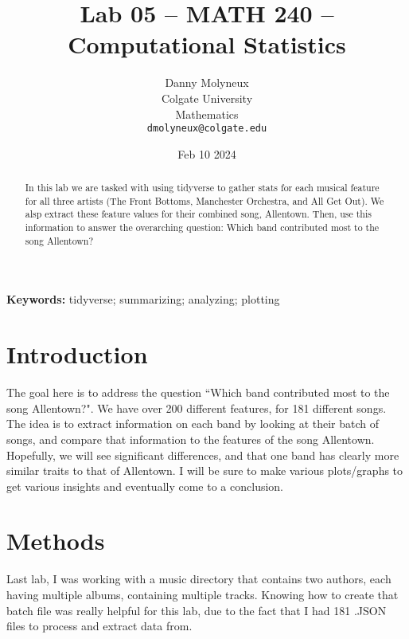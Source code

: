 \documentclass{article}\usepackage[]{graphicx}\usepackage[]{xcolor}
\begin{document}
\vspace{-1in}
\title{Lab 05 -- MATH 240 -- Computational Statistics}

\author{
  Danny Molyneux \\
  Colgate University  \\
  Mathematics  \\
  {\tt dmolyneux@colgate.edu}
}

\date{Feb 10 2024}

\maketitle


\begin{multicols}{2}
\begin{abstract}
In this lab we are tasked with using tidyverse \citep{tidyverse} to gather stats for each musical feature for all three artists (The Front Bottoms, Manchester Orchestra, and All Get Out). We alsp extract these feature values for their combined song, Allentown. Then, use this information to answer the overarching question: Which band contributed most to the song Allentown?
\end{abstract}

\noindent \textbf{Keywords:} tidyverse; summarizing; analyzing; plotting


\section{Introduction}
The goal here is to address the question ``Which band contributed most to the song Allentown?". We have over 200 different features, for 181 different songs. The idea is to extract information on each band by looking at their batch of songs, and compare that information to the features of the song Allentown. Hopefully, we will see significant differences, and that one band has clearly more similar traits to that of Allentown. I will be sure to make various plots/graphs to get various insights and eventually come to a conclusion.



\section{Methods}
Last lab, I was working with a music directory that contains two authors, each having multiple albums, containing multiple tracks. Knowing how to create that batch file was really helpful for this lab, due to the fact that I had 181 .JSON files to process and extract data from.


\end{multicols}
\end{document}
